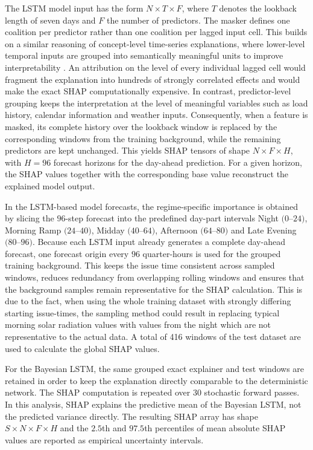 \documentclass[Master,english,IEEE]{twbook}
\begin{document}
The LSTM model input has the form $N \times T \times F$, where $T$ denotes the lookback length of seven days and $F$ the number of predictors. The masker defines one coalition per predictor rather than one coalition per lagged input cell. This builds on a similar reasoning of concept-level time-series explanations, where lower-level temporal inputs are grouped into semantically meaningful units to improve interpretability \cite{jutteCSHAPTimeSeries2025}. An attribution on the level of every individual lagged cell would fragment the explanation into hundreds of strongly correlated effects and would make the exact SHAP computationally expensive. In contrast, predictor-level grouping keeps the interpretation at the level of meaningful variables such as load history, calendar information and weather inputs. Consequently, when a feature is masked, its complete history over the lookback window is replaced by the corresponding windows from the training background, while the remaining predictors are kept unchanged. This yields SHAP tensors of shape $N \times F \times H$, with $H=96$ forecast horizons for the day-ahead prediction. For a given horizon, the SHAP values together with the corresponding base value reconstruct the explained model output.

In the LSTM-based model forecasts, the regime-specific importance is obtained by slicing the $96$-step forecast into the predefined day-part intervals Night $(0$--$24)$, Morning Ramp $(24$--$40)$, Midday $(40$--$64)$, Afternoon $(64$--$80)$ and Late Evening $(80$--$96)$. Because each LSTM input already generates a complete day-ahead forecast, one forecast origin every $96$ quarter-hours is used for the grouped training background. This keeps the issue time consistent across sampled windows, reduces redundancy from overlapping rolling windows and ensures that the background samples remain representative for the SHAP calculation. This is due to the fact, when using the whole training dataset with strongly differing starting issue-times, the sampling method could result in replacing typical morning solar radiation values with values from the night which are not representative to the actual data. A total of 416 windows of the test dataset are used to calculate the global SHAP values.

For the Bayesian LSTM, the same grouped exact explainer and test windows are retained in order to keep the explanation directly comparable to the deterministic network. The SHAP computation is repeated over $30$ stochastic forward passes. In this analysis, SHAP explains the predictive mean of the Bayesian LSTM, not the predicted variance directly. The resulting SHAP array has shape $S \times N \times F \times H$ and the $2.5$th and $97.5$th percentiles of mean absolute SHAP values are reported as empirical uncertainty intervals.
\end{document}
